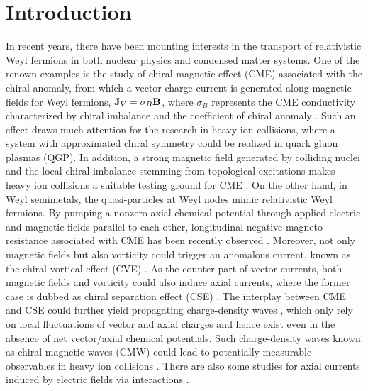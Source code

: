 \documentclass[aps,prd,showkeys,preprint,amsmath,amssymb,nofootinbib]{revtex4-1}
\begin{document}
\section{Introduction}
In recent years, there have been mounting interests in the transport of relativistic Weyl fermions in both nuclear physics and condensed matter systems. One of the renown examples is the study of chiral magnetic effect (CME) associated with the chiral anomaly, from which a vector-charge current is generated along magnetic fields for Weyl fermions,
${\bf J}_V=\sigma_B{\bf B}$, where $\sigma_B$ represents the CME conductivity characterized by chiral imbalance and the coefficient of chiral anomaly \cite{Vilenkin:1980fu}. Such an effect draws much attention for the research in heavy ion collisions, where a system with approximated chiral symmetry could be realized in quark gluon plasmas (QGP). In addition, a strong magnetic field generated by colliding nuclei and the local chiral imbalance stemming from topological excitations makes heavy ion collisions a suitable testing ground for CME \cite{Kharzeev:2007jp,Fukushima:2008xe,Kharzeev:2009pj,Kharzeev:2015znc}. On the other hand, in Weyl semimetals, the quasi-particles at Weyl nodes mimic relativistic Weyl fermions. By pumping a nonzero axial chemical potential through applied electric and magnetic fields parallel to each other, longitudinal negative magneto-resistance associated with CME has been recently observed \cite{Li:2014bha}. Moreover, not only magnetic fields but also vorticity could trigger an anomalous current, known as the chiral vortical effect (CVE) \cite{Vilenkin:1979ui}. As the counter part of vector currents, both magnetic fields and vorticity could also induce axial currents, where the former case is dubbed as chiral separation effect (CSE) \cite{Fukushima:2008xe}. The interplay between CME and CSE could further yield propagating charge-density waves \cite{Kharzeev:2010gd}, which only rely on local fluctuations of vector and axial charges and hence exist even in the absence of net vector/axial chemical potentials. Such charge-density waves known as chiral magnetic waves (CMW) could lead to potentially measurable observables in heavy ion collisions \cite{Burnier:2011bf}.
There are also some studies for axial currents induced by electric fields via interactions \cite{Huang:2013iia,Pu:2014cwa,Pu:2014fva}.     
\end{document}
